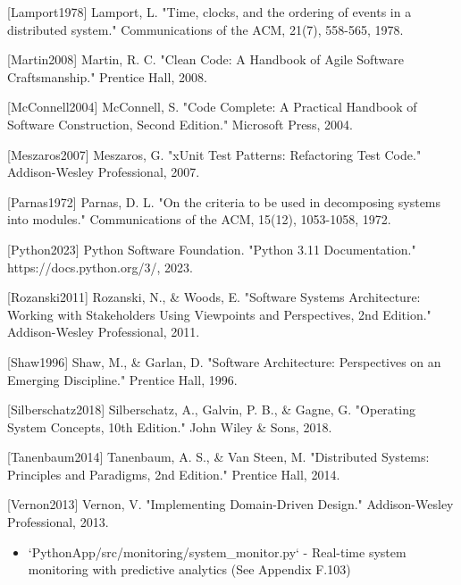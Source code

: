 \documentclass[12pt,a4paper]{article}
\begin{document}
[Lamport1978] Lamport, L. "Time, clocks, and the ordering of events in a distributed system." Communications of the ACM,
21(7), 558-565, 1978.

[Martin2008] Martin, R. C. "Clean Code: A Handbook of Agile Software Craftsmanship." Prentice Hall, 2008.

[McConnell2004] McConnell, S. "Code Complete: A Practical Handbook of Software Construction, Second Edition." Microsoft
Press, 2004.

[Meszaros2007] Meszaros, G. "xUnit Test Patterns: Refactoring Test Code." Addison-Wesley Professional, 2007.

[Parnas1972] Parnas, D. L. "On the criteria to be used in decomposing systems into modules." Communications of the ACM,
15(12), 1053-1058, 1972.

[Python2023] Python Software Foundation. "Python 3.11 Documentation." https://docs.python.org/3/, 2023.

[Rozanski2011] Rozanski, N., \& Woods, E. "Software Systems Architecture: Working with Stakeholders Using Viewpoints and
Perspectives, 2nd Edition." Addison-Wesley Professional, 2011.

[Shaw1996] Shaw, M., \& Garlan, D. "Software Architecture: Perspectives on an Emerging Discipline." Prentice Hall, 1996.

[Silberschatz2018] Silberschatz, A., Galvin, P. B., \& Gagne, G. "Operating System Concepts, 10th Edition." John Wiley \&
Sons, 2018.

[Tanenbaum2014] Tanenbaum, A. S., \& Van Steen, M. "Distributed Systems: Principles and Paradigms, 2nd Edition." Prentice
Hall, 2014.

[Vernon2013] Vernon, V. "Implementing Domain-Driven Design." Addison-Wesley Professional, 2013.

\begin{itemize}
\item `PythonApp/src/monitoring/system_monitor.py` - Real-time system monitoring with predictive analytics (See Appendix
  F.103)
\end{itemize}
\end{document}
